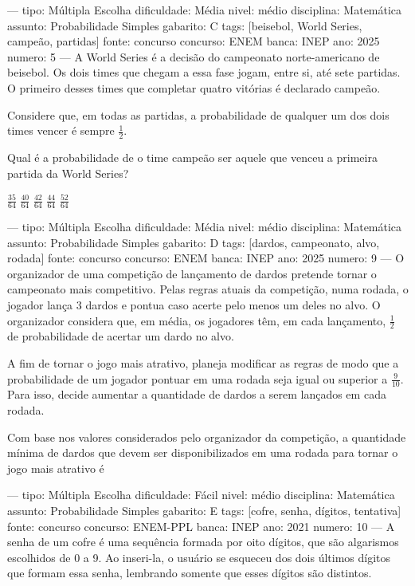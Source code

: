 ---
tipo: Múltipla Escolha
dificuldade: Média
nivel: médio
disciplina: Matemática
assunto: Probabilidade Simples
gabarito: C
tags: [beisebol, World Series, campeão, partidas]
fonte: concurso
concurso: ENEM
banca: INEP
ano: 2025
numero: 5
---
\question
A World Series é a decisão do campeonato norte-americano de beisebol. Os dois times que chegam a essa fase jogam, entre si, até sete partidas. O primeiro desses times que completar quatro vitórias é declarado campeão.

Considere que, em todas as partidas, a probabilidade de qualquer um dos dois times vencer é sempre \( \frac{1}{2} \).

Qual é a probabilidade de o time campeão ser aquele que venceu a primeira partida da World Series?
\begin{choices}
\choice \( \frac{35}{64} \)
\choice \( \frac{40}{64} \)
\correctchoice \( \frac{42}{64} \)
\choice \( \frac{44}{64} \)
\choice \( \frac{52}{64} \)
\end{choices}

---
tipo: Múltipla Escolha
dificuldade: Média
nivel: médio
disciplina: Matemática
assunto: Probabilidade Simples
gabarito: D
tags: [dardos, campeonato, alvo, rodada]
fonte: concurso
concurso: ENEM
banca: INEP
ano: 2025
numero: 9
---
\question
O organizador de uma competição de lançamento de dardos pretende tornar o campeonato mais competitivo. Pelas regras atuais da competição, numa rodada, o jogador lança 3 dardos e pontua caso acerte pelo menos um deles no alvo. O organizador considera que, em média, os jogadores têm, em cada lançamento, \( \frac{1}{2} \) de probabilidade de acertar um dardo no alvo.

A fim de tornar o jogo mais atrativo, planeja modificar as regras de modo que a probabilidade de um jogador pontuar em uma rodada seja igual ou superior a \( \frac{9}{10} \). Para isso, decide aumentar a quantidade de dardos a serem lançados em cada rodada.

Com base nos valores considerados pelo organizador da competição, a quantidade mínima de dardos que devem ser disponibilizados em uma rodada para tornar o jogo mais atrativo é
\begin{oneparchoices}
\end{oneparchoices}

---
tipo: Múltipla Escolha
dificuldade: Fácil
nivel: médio
disciplina: Matemática
assunto: Probabilidade Simples
gabarito: E
tags: [cofre, senha, dígitos, tentativa]
fonte: concurso
concurso: ENEM-PPL
banca: INEP
ano: 2021
numero: 10
---
\question
A senha de um cofre é uma sequência formada por oito dígitos, que são algarismos escolhidos de 0 a 9. Ao inseri-la, o usuário se esqueceu dos dois últimos dígitos que formam essa senha, lembrando somente que esses dígitos são distintos.

